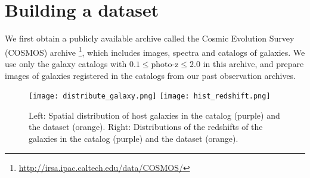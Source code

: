 \documentclass[conference,compsoc]{IEEEtran}
\begin{document}



\section{Building a dataset}
\label{sec:data}


  We first obtain a publicly available archive called the Cosmic Evolution Survey (COSMOS) archive \footnote{\url{http://irsa.ipac.caltech.edu/data/COSMOS/}}, which includes images, spectra and catalogs of galaxies.
  We use only the galaxy catalogs with $0.1\le$photo-z$\le 2.0$ in this archive, and prepare images of galaxies registered in the catalogs from our past observation archives.

\begin{figure}[t]
  \begin{center}
    \texttt{[image: distribute\_galaxy.png]}
    \texttt{[image: hist\_redshift.png]}
  \end{center}
  \caption{%
    Left: Spatial distribution of host galaxies in the catalog (purple) and the dataset (orange).
    Right: Distributions of the redshifts of the galaxies in the catalog (purple) and the dataset (orange).
  }
  \label{fig:distribute_galaxy}
\end{figure}
\end{document}

